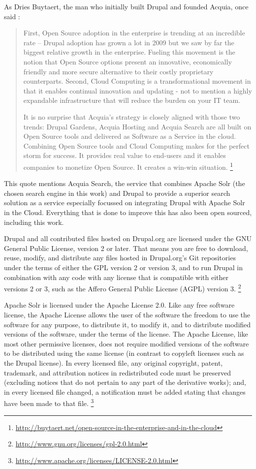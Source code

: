 As Dries Buytaert, the man who initially built Drupal and founded Acquia, once said : 
\begin{quote}First, Open Source adoption in the enterprise is trending at an incredible rate -- Drupal adoption has grown a lot in 2009 but we saw by far the biggest relative growth in the enterprise. Fueling this movement is the notion that Open Source options present an innovative, economically friendly and more secure alternative to their costly proprietary counterparts. Second, Cloud Computing is a transformational movement in that it enables continual innovation and updating - not to mention a highly expandable infrastructure that will reduce the burden on your IT team.

It is no surprise that Acquia's strategy is closely aligned with those two trends: Drupal Gardens, Acquia Hosting and Acquia Search are all built on Open Source tools and delivered as Software as a Service in the cloud. Combining Open Source tools and Cloud Computing makes for the perfect storm for success. It provides real value to end-users and it enables companies to monetize Open Source. It creates a win-win situation. \footnote{\url{http://buytaert.net/open-source-in-the-enterprise-and-in-the-cloud}} \end{quote}

This quote mentions Acquia Search, the service that combines Apache Solr (the chosen search engine in this work) and Drupal to provide a superior search solution as a service especially focussed on integrating Drupal with Apache Solr in the Cloud. Everything that is done to improve this has also been open sourced, including this work.

Drupal and all contributed files hosted on Drupal.org are licensed under the GNU General Public License, version 2 or later. That means you are free to download, reuse, modify, and distribute any files hosted in Drupal.org's Git repositories under the terms of either the GPL version 2 or version 3, and to run Drupal in combination with any code with any license that is compatible with either versions 2 or 3, such as the Affero General Public License (AGPL) version 3. \footnote{\url{http://www.gnu.org/licenses/gpl-2.0.html}}

Apache Solr is licensed under the Apache License 2.0. Like any free software license, the Apache License allows the user of the software the freedom to use the software for any purpose, to distribute it, to modify it, and to distribute modified versions of the software, under the terms of the license. The Apache License, like most other permissive licenses, does not require modified versions of the software to be distributed using the same license (in contrast to copyleft licenses such as the Drupal license). In every licensed file, any original copyright, patent, trademark, and attribution notices in redistributed code must be preserved (excluding notices that do not pertain to any part of the derivative works); and, in every licensed file changed, a notification must be added stating that changes have been made to that file. \footnote{\url{http://www.apache.org/licenses/LICENSE-2.0.html}}

